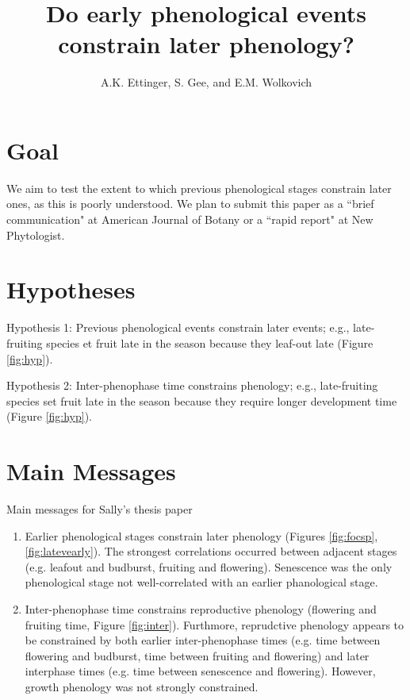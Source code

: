 \documentclass{article}
\begin{document}
 
\title{Do early phenological events constrain later phenology?} 
\author{A.K. Ettinger, S. Gee, and E.M. Wolkovich}
\maketitle  %

\section* {Goal}
\par We aim to test the extent to which previous phenological stages constrain later ones, as this is poorly understood. We plan to submit this paper as a ``brief communication" at	American Journal of Botany or a ``rapid report" at
New Phytologist.

\section* {Hypotheses}
\par Hypothesis 1: Previous phenological events constrain later events; e.g., late-fruiting species et fruit late in the season because they leaf-out late  (Figure \ref{fig:hyp}).
\par Hypothesis 2: Inter-phenophase time  constrains phenology; e.g., late-fruiting species set fruit late in the season because they require longer development time (Figure \ref{fig:hyp}).

\section* {Main Messages}
Main messages for Sally's thesis paper
\begin{enumerate}
\item Earlier phenological stages constrain later phenology (Figures \ref{fig:focsp}, \ref{fig:latevearly}). The strongest correlations occurred between adjacent stages (e.g. leafout and budburst, fruiting and flowering). Senescence was the only phenological stage not well-correlated with an earlier phanological stage.
\item Inter-phenophase time constrains reproductive phenology (flowering and fruiting time, Figure \ref{fig:inter}). Furthmore, reprudctive phenology appears to be constrained by both earlier inter-phenophase times (e.g. time between flowering and budburst, time between fruiting and flowering) and later interphase times (e.g. time between senescence and flowering). However, growth phenology was not strongly constrained.

\end{enumerate}
\end{document}
